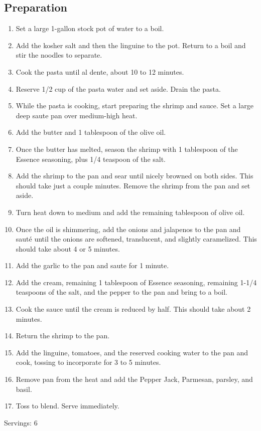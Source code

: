 \subsection{Preparation}
\begin{enumerate}
    \item Set a large 1-gallon stock pot of water to a boil.
    \item Add the kosher salt and then the linguine to the pot. Return to a boil and stir the noodles to separate.
    \item Cook the pasta until al dente, about 10 to 12 minutes.
    \item Reserve 1/2 cup of the pasta water and set aside. Drain the pasta.
    \item While the pasta is cooking, start preparing the shrimp and sauce. Set a large deep saute pan over medium-high heat. 
    \item Add the butter and 1 tablespoon of the olive oil.
    \item Once the butter has melted, season the shrimp with 1 tablespoon of the Essence seasoning, plus 1/4 teaspoon of the salt.
    \item Add the shrimp to the pan and sear until nicely browned on both sides. This should take just a couple minutes. Remove the shrimp from the pan and set aside.
    \item Turn heat down to medium and add the remaining tablespoon of olive oil.
    \item Once the oil is shimmering, add the onions and jalapenos to the pan and saut\'{e} until the onions are softened, translucent, and slightly caramelized. This should take about 4 or 5 minutes.
    \item Add the garlic to the pan and saute for 1 minute.
    \item Add the cream, remaining 1 tablespoon of Essence seasoning, remaining 1-1/4 teaspoons of the salt, and the pepper to the pan and bring to a boil.
    \item Cook the sauce until the cream is reduced by half. This should take about 2 minutes.
    \item Return the shrimp to the pan.
    \item Add the linguine, tomatoes, and the reserved cooking water to the pan and cook, tossing to incorporate for 3 to 5 minutes.
    \item Remove pan from the heat and add the Pepper Jack, Parmesan, parsley, and basil.
    \item Toss to blend. Serve immediately.
\end{enumerate}


Servings:  6
